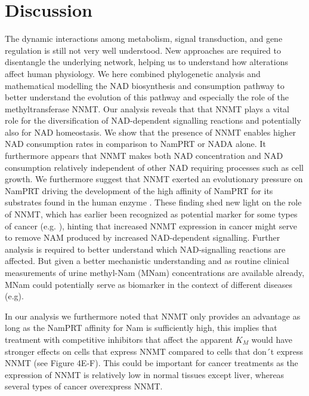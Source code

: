 \section{Discussion}



The dynamic interactions among metabolism, signal transduction, and gene regulation is still not very well understood. New approaches are required to disentangle the underlying network, helping us to understand how alterations affect human physiology. We here combined phylogenetic analysis and mathematical modelling the NAD biosynthesis and consumption pathway to better understand the evolution of this pathway and  especially the role of the methyltransferase NNMT. Our analysis reveals that that NNMT plays a vital role for the diversification of NAD-dependent signalling reactions and potentially also for NAD homeostasis. We show that the presence of NNMT enables higher NAD consumption rates in comparison to NamPRT or NADA alone. It furthermore appears that NNMT makes both NAD concentration and NAD consumption relatively independent of other NAD requiring processes such as cell growth. We furthermore suggest that NNMT exerted an evolutionary pressure on NamPRT driving the development of the high affinity of NamPRT for its substrates found in the human enzyme \cite{Burgos2008}. These finding shed new light on the role of NNMT, which has  earlier  been recognized  as potential marker for some types of cancer (e.g. \cite{Okamura1998}), hinting that increased NNMT expression in cancer might serve to remove  NAM produced by increased NAD-dependent signalling. Further analysis is required to better understand which NAD-signalling reactions are affected. But given a better mechanistic understanding and as routine clinical measurements of urine methyl-Nam (MNam) concentrations are available already, MNam could potentially serve as biomarker in the context of different diseases (e.g\cite{Pumpo2001,Delaney2005}). 

In our analysis we furthermore noted that NNMT only provides an advantage as long as the NamPRT affinity for Nam is sufficiently high, this implies that treatment with competitive inhibitors that affect the apparent $K_M$ would have stronger effects on cells that express NNMT compared to cells that don´t express NNMT (see Figure 4E-F). This could be important for cancer treatments as the expression of NNMT is relatively low in normal tissues except liver, whereas several types of cancer overexpress NNMT.

